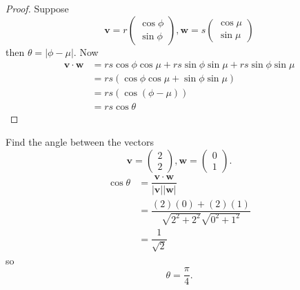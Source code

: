 \begin{proof}
    Suppose
    \[
        \bm v=r
        \begin{pmatrix}
            \cos\phi\\
            \sin\phi
        \end{pmatrix}
        ,\bm w=s
        \begin{pmatrix}
            \cos\mu\\
            \sin\mu
        \end{pmatrix}
    \]
    then $\theta=|\phi-\mu|$.
    Now
    \begin{align*}
        \bm v\cdot\bm w&=rs\cos\phi\cos\mu+rs\sin\phi\sin\mu+rs\sin\phi\sin\mu\\
        &=rs(\cos\phi\cos\mu+\sin\phi\sin\mu)\\
        &=rs(\cos{(\phi-\mu)})\\
        &=rs\cos\theta
    \end{align*}
\end{proof}

\begin{example}
    Find the angle between the vectors
    \[
        \bm v=
        \begin{pmatrix}
            2\\
            2
        \end{pmatrix}
        ,\bm w=
        \begin{pmatrix}
            0\\
            1
        \end{pmatrix}
        .
    \]
    \begin{align*}
        \cos\theta&=\dfrac{\bm v\cdot\bm w}{|\bm v||\bm w|}\\
        &=\dfrac{(2)(0)+(2)(1)}{\sqrt{2^2+2^2}\sqrt{0^2+1^2}}\\
        &=\dfrac 1{\sqrt{2}}
    \end{align*}
    so
    \[
        \theta=\dfrac\pi 4.
    \]
\end{example}

